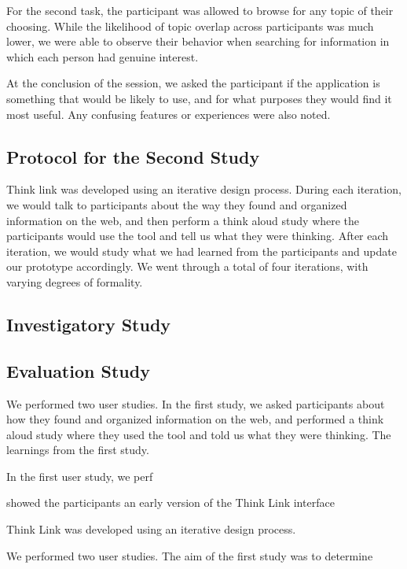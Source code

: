 \documentclass{chi2009}
\begin{document}
For the second task, the participant was allowed to browse for any topic of their choosing. While the likelihood of topic overlap across participants was much lower, we were able to observe their behavior when searching for information in which each person had genuine interest.

At the conclusion of the session, we asked the participant if the application is something that would be likely to use, and for what purposes they would find it most useful. Any confusing features or experiences were also noted.

\subsection{Protocol for the Second Study}



Think link was developed using an iterative design process. During each iteration, we would talk to participants about the way they found and organized information on the web, and then perform a think aloud study where the participants would use the tool and tell us what they were thinking. After each iteration, we would study what we had learned from the participants and update our prototype accordingly. We went through a total of four iterations, with varying degrees of formality.

\subsection{Investigatory Study}



\subsection{Evaluation Study}




We performed two user studies. In the first study, we asked participants about how they found and organized information on the web, and performed a think aloud study where they used the tool and told us what they were thinking. The learnings from the first study.

In the first user study, we perf

showed the participants an early version of the Think Link interface

Think Link was developed using an iterative design process. 



We performed two user studies. The aim of the first study was to determine 
\end{document}
